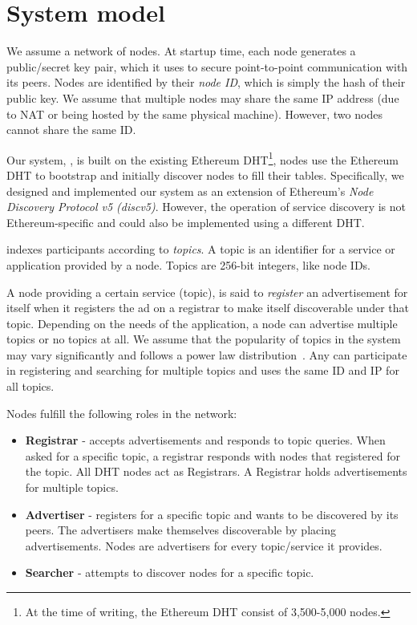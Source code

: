 
\section{System model}
\label{sec:model}

We assume a network of nodes. At startup time, each node generates a public/secret key pair, which it uses to secure point-to-point communication with its peers. Nodes are identified by their \emph{node ID}, which is simply the hash of their public key. We assume that multiple nodes may share the same IP address (due to NAT or being hosted by the same physical machine). However, two nodes cannot share the same ID.

Our system, \sysname, is built on the existing Ethereum DHT\footnote{At the time of writing, the Ethereum DHT consist of 3,500-5,000 nodes.}, \ie nodes use the Ethereum DHT to bootstrap and initially discover nodes to fill their tables. Specifically, we designed and implemented our system as an extension of Ethereum's \emph{Node Discovery Protocol v5 (discv5)}. However, the operation of service discovery is not Ethereum-specific and could also be implemented using a different DHT.

\sysname indexes participants according to \emph{topics}. A topic is an identifier for a
service or application provided by a node. Topics are 256-bit integers, like node IDs.

A node providing a certain service (topic), is said to \emph{register} an advertisement for itself when it registers the ad on a registrar to make itself discoverable under that topic. Depending on the needs of the application, a node can advertise multiple topics or no topics at all. We assume that the popularity of topics in the system may vary significantly and follows a power law distribution~\cite{kim2018measuring}. Any can participate in registering and searching for multiple topics and uses the same ID and IP for all topics.


Nodes fulfill the following roles in the network:

\begin{itemize}
    \item \textbf{Registrar} - accepts advertisements and responds to topic queries. When asked for a specific topic, a registrar responds with nodes that registered for the topic.  All DHT nodes act as Registrars. A Registrar holds advertisements for multiple topics.
    \item \textbf{Advertiser} - registers for a specific topic and wants to be discovered by its peers. The advertisers make themselves discoverable by placing advertisements. Nodes are advertisers for every topic/service it provides.
    \item \textbf{Searcher} - attempts to discover nodes for a specific topic.
\end{itemize}

